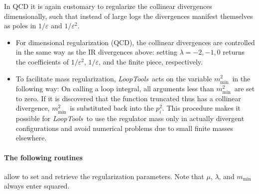 \documentclass[twoside,12pt]{report}
\def\LT{\textit{LoopTools}}
\def\mmin{\ensuremath{m_{\text{min}}^2}}
\begin{document}
In QCD it is again customary to regularize the collinear divergences 
dimensionally, such that instead of large logs the divergences manifest
themselves as poles in $1/\varepsilon$ and $1/\varepsilon^2$.

\begin{itemize}
\item
For dimensional regularization (QCD), the collinear divergences are
controlled in the same way as the IR divergences above: setting
$\lambda = -2, -1, 0$ returns the coefficients of $1/\varepsilon^2$, 
$1/\varepsilon$, and the finite piece, respectively.

\item
To facilitate mass regularization, \LT\ acts on the variable \mmin\ in
the following way: On calling a loop integral, all arguments less than
\mmin\ are set to zero.  If it is discovered that the function truncated
thus has a collinear divergence, \mmin\ is substituted back into the
$p_i^2$.  This procedure makes it possible for \LT\ to use the regulator
mass only in actually divergent configurations and avoid numerical
problems due to small finite masses elsewhere.
\end{itemize}


\paragraph{The following routines} allow to set and retrieve the
regularization parameters.  Note that $\mu$, $\lambda$, and $m_{\text{min}}$
always enter squared.
\end{document}

